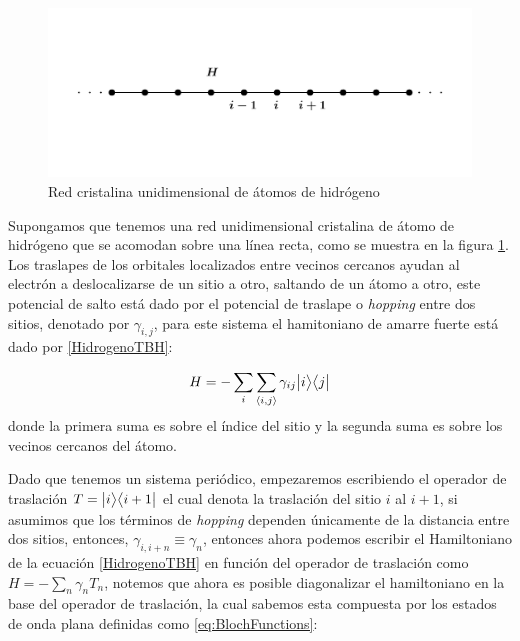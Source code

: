     \begin{figure}[h!]
        \centering
        \includegraphics[width=\textwidth]{Imagenes/Models/TB_example.pdf}\vspace{-1.5cm}
        \caption{Red cristalina unidimensional de átomos de hidrógeno}
        \label{fig:Hidrogen_chain}
    \end{figure}
    
    Supongamos que tenemos una red unidimensional cristalina de átomo de hidrógeno que se acomodan sobre una línea recta, como se muestra en la figura \ref{fig:Hidrogen_chain}. Los traslapes de los orbitales localizados entre vecinos cercanos ayudan al electrón a deslocalizarse de un sitio a otro, saltando de un átomo a otro, este potencial de salto está dado por el potencial de traslape o \textit{hopping} entre dos sitios, denotado por $\gamma_{i,j}$, para este sistema el hamitoniano de amarre fuerte está dado por \eqref{HidrogenoTBH}:

    \begin{equation}
        \label{HidrogenoTBH}
        H =  -\sum_{i}\sum_{\langle i, j \rangle } \gamma_{ij} \big |{i}\big \rangle\big \langle{j}\big |
    \end{equation}
    donde la primera suma es sobre el índice del sitio y la segunda suma es sobre los vecinos cercanos del átomo.
    
    Dado que tenemos un sistema periódico, empezaremos escribiendo el operador de traslación $T = \big |{i}\big \rangle\big \langle{i+1}\big |$ el cual denota la traslación del sitio $i$ al $i+1$, si asumimos que los términos de {\it hopping} dependen únicamente de la distancia entre dos sitios, entonces, $\gamma_{i,i+n} \equiv \gamma_{n}$, entonces ahora podemos escribir el Hamiltoniano de la ecuación \eqref{HidrogenoTBH} en función del operador de traslación como $H = -\sum_n \gamma_n T_n$, notemos que ahora es posible diagonalizar el hamiltoniano en la base del operador de traslación, la cual sabemos esta compuesta por los estados de onda plana definidas como \eqref{eq:BlochFunctions}:

